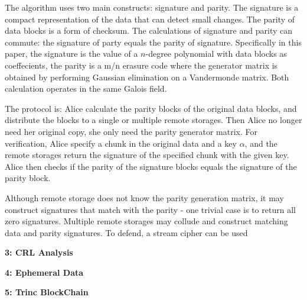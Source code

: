 \documentclass[10pt]{article}
\newcommand\question[2]{\vspace{.1in}\textbf{#1: #2}\vspace{.5em}\vspace{.10in}}
\begin{document}
The algorithm uses two main constructs: signature and parity. The signature is a
compact representation of the data that can detect small changes. The parity of
data blocks is a form of checksum. The calculations of signature and parity can
commute: the signature of party equals the parity of signature. Specifically in
this paper, the signature is the value of a $n$-degree polynomial with data
blocks as coeffecients, the parity is a m/n erasure code where the generator
matrix is obtained by performing Gaussian elimination on a Vandermonde matrix.
Both calculation operates in the same Galois field.

The protocol is: Alice calculate the parity blocks of the original data blocks,
and distribute the blocks to a single or multiple remote storages. Then Alice no
longer need her original copy, she only need the parity generator matrix. For
verification, Alice specify a chunk in the original data and a key $\alpha$, and
the remote storages return the signature of the specified chunk with the given
key. Alice then checks if the parity of the signature blocks equals the
signature of the parity block.

Although remote storage does not know the parity generation matrix, it may
construct signatures that match with the parity - one trivial case is to return
all zero signatures. Multiple remote storages may collude and construct matching
data and parity signatures. To defend, a stream cipher can be used 

\newpage
\question{3}{CRL Analysis}

\newpage
\question{4}{Ephemeral Data}


\newpage
\question{5}{Trinc BlockChain}
\end{document}
